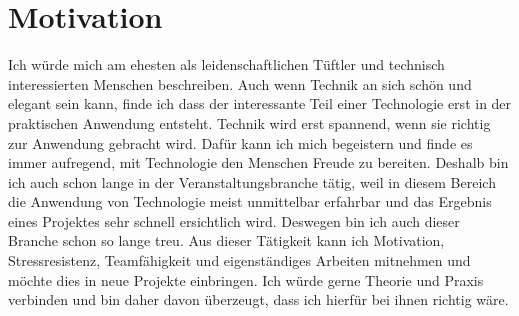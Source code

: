 {} {}{}



\section {Motivation}




Ich würde mich am ehesten als leidenschaftlichen Tüftler und technisch interessierten Menschen beschreiben. Auch wenn Technik an sich schön und elegant sein kann, finde ich dass der interessante Teil einer Technologie erst in der praktischen Anwendung entsteht. Technik wird erst spannend, wenn sie richtig zur Anwendung gebracht wird. Dafür kann ich mich begeistern und finde es immer aufregend, mit Technologie den Menschen Freude zu bereiten. Deshalb bin ich auch schon lange in der Veranstaltungsbranche tätig, weil in diesem Bereich die Anwendung von Technologie meist unmittelbar erfahrbar und das Ergebnis eines Projektes sehr schnell ersichtlich wird. Deswegen bin ich auch dieser Branche schon so lange treu. Aus dieser Tätigkeit kann ich Motivation, Stressresistenz, Teamfähigkeit und eigenständiges Arbeiten mitnehmen und möchte dies in neue Projekte einbringen. Ich würde gerne Theorie und Praxis verbinden und bin daher davon überzeugt, dass ich hierfür bei ihnen richtig wäre. 

